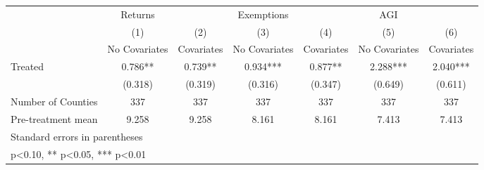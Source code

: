 {
\def\sym#1{\ifmmode^{#1}\else\(^{#1}\)\fi}
\begin{tabular}{l*{6}{c}}
\hline\hline
            &     Returns   &               &  Exemptions   &               &         AGI   &               \\
            &\multicolumn{1}{c}{(1)}&\multicolumn{1}{c}{(2)}&\multicolumn{1}{c}{(3)}&\multicolumn{1}{c}{(4)}&\multicolumn{1}{c}{(5)}&\multicolumn{1}{c}{(6)}\\
            &\multicolumn{1}{c}{No Covariates}&\multicolumn{1}{c}{Covariates}&\multicolumn{1}{c}{No Covariates}&\multicolumn{1}{c}{Covariates}&\multicolumn{1}{c}{No Covariates}&\multicolumn{1}{c}{Covariates}\\
\hline
Treated     &       0.786** &       0.739** &       0.934***&       0.877** &       2.288***&       2.040***\\
            &     (0.318)   &     (0.319)   &     (0.316)   &     (0.347)   &     (0.649)   &     (0.611)   \\
\hline
Number of Counties&         337   &         337   &         337   &         337   &         337   &         337   \\
Pre-treatment mean&       9.258   &       9.258   &       8.161   &       8.161   &       7.413   &       7.413   \\
\hline\hline
\multicolumn{7}{l}{\footnotesize Standard errors in parentheses}\\
\multicolumn{7}{l}{\footnotesize * p<0.10, ** p<0.05, *** p<0.01}\\
\end{tabular}
}
